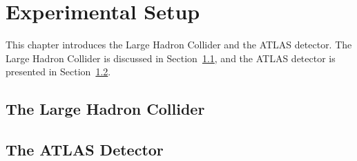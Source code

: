 \chapter{Experimental Setup}
\begin{chapabstract}
This chapter introduces the Large Hadron Collider and the ATLAS detector. 
The Large Hadron Collider is discussed in Section~\ref{lhc}, and the ATLAS detector 
is presented in Section~\ref{atlas}. 
\end{chapabstract}
\label{expSetup}

	\section{The Large Hadron Collider }
	\label{lhc}
	

	\section{The ATLAS Detector}
	\label{atlas}
	

